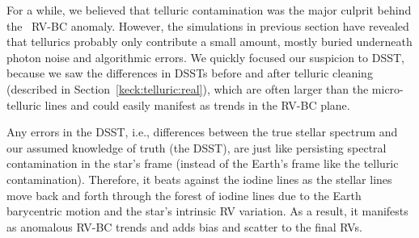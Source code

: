 
For a while, we believed that telluric contamination was the major culprit
behind the \keck\ RV-BC anomaly. However, the simulations in previous
section have revealed that tellurics probably only contribute a small
amount, mostly buried underneath photon noise and algorithmic
errors. We quickly focused our suspicion to DSST, because we saw the
differences in DSSTs before and after telluric cleaning (described in
Section~\ref{keck:telluric:real}), which are often larger than the
micro-telluric lines and could easily manifest as trends in the RV-BC
plane.

Any errors in the DSST, i.e., differences between the true stellar
spectrum and our assumed knowledge of truth (the DSST), are just like
persisting spectral contamination in the star's frame (instead of the
Earth's frame like the telluric contamination). Therefore, it beats
against the iodine lines as the stellar lines move back and forth
through the forest of iodine lines due to the Earth barycentric motion
and the star's intrinsic RV variation. As a result, it manifests as
anomalous RV-BC trends and adds bias and scatter to the final RVs.

